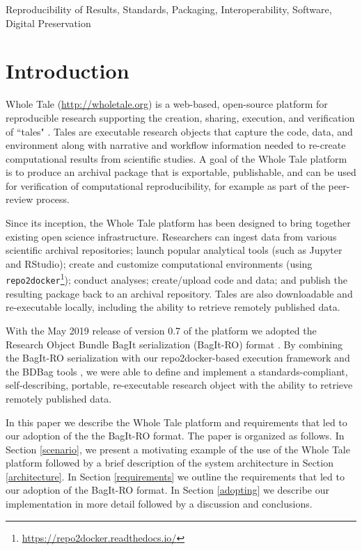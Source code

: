 \documentclass[conference]{IEEEtran}
\begin{document}
\begin{IEEEkeywords}
Reproducibility of Results, Standards, Packaging, Interoperability, Software, Digital Preservation
\end{IEEEkeywords}

\section{Introduction}

Whole Tale (\url{http://wholetale.org}) is a web-based, open-source platform for reproducible research 
supporting the creation, sharing, execution, and verification of ``tales" \cite{brinckman2019, chard2019}. Tales are executable research objects that capture the code, data, and environment along with narrative and workflow information needed to re-create computational results from scientific studies. A goal of the Whole Tale platform is to produce an archival package that is exportable, publishable, and can be used for verification of computational reproducibility, for example as part of the peer-review process.

Since its inception, the Whole Tale platform has been designed to bring together existing open 
science infrastructure.  Researchers can ingest data from various scientific archival 
repositories; launch popular analytical tools (such as Jupyter and RStudio); create and customize 
computational environments (using \texttt{repo2docker}\footnote{\url{https://repo2docker.readthedocs.io/}}); 
conduct analyses; create/upload code and data; and publish the resulting package back to an
archival repository. Tales are also downloadable and re-executable locally, including the 
ability to retrieve remotely published data.  

With the May 2019 release of version 0.7 of the platform we adopted the Research Object Bundle BagIt serialization (BagIt-RO) format \cite{soilandreyes2014}. By combining the BagIt-RO 
serialization with our repo2docker-based execution framework and the BDBag tools 
\cite{chard2016}, we were able to define and implement a standards-compliant, self-describing, 
portable, re-executable research object with the ability to retrieve remotely published data.  

In this paper we describe the Whole Tale platform and requirements that led to our adoption of the
the BagIt-RO format. The paper is organized as follows. In Section \ref{scenario}, we present a 
motivating example of the  use of the Whole Tale platform followed by a brief description of the 
system architecture in Section \ref{architecture}. In Section \ref{requirements} we outline the 
requirements that led to our adoption of the BagIt-RO format. In Section \ref{adopting} we describe
our implementation in more detail followed by a discussion and conclusions.
\end{document}
